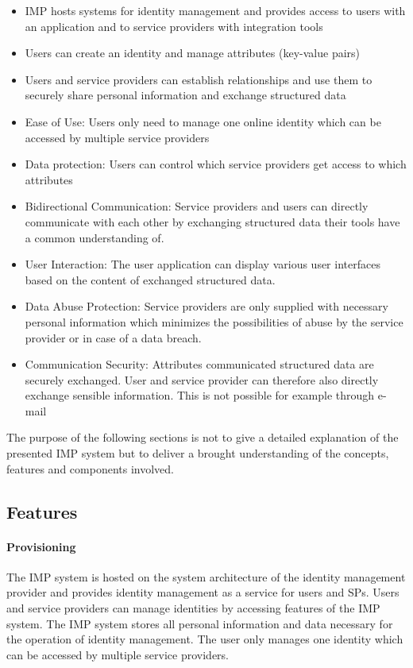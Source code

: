 \begin{itemize}
    \item IMP hosts systems for identity management and provides access to users with an application and to service providers with integration tools
    \item Users can create an identity and manage attributes (key-value pairs)
    \item Users and service providers can establish relationships and use them to securely share personal information and exchange structured data
\end{itemize}

\begin{itemize}
    \item Ease of Use: Users only need to manage one online identity which can be accessed by multiple service providers
    \item Data protection: Users can control which service providers get access to which attributes
    \item Bidirectional Communication: Service providers and users can directly communicate with each other by exchanging structured data their tools have a common understanding of.
    \item User Interaction: The user application can display various user interfaces based on the content of exchanged structured data.
    \item Data Abuse Protection: Service providers are only supplied with necessary personal information which minimizes the possibilities of abuse by the service provider or in case of a data breach.
    \item Communication Security: Attributes communicated structured data are securely exchanged. User and service provider can therefore also directly exchange sensible information. This is not possible for example through e-mail
\end{itemize}


The purpose of the following sections is not to give a detailed explanation of the presented IMP system but to deliver a brought understanding of the concepts, features and components involved.

\subsection{Features}

\paragraph{Provisioning} The IMP system is hosted on the system architecture of the identity management provider and provides identity management as a service for users and SPs. Users and service providers can manage identities by accessing features of the IMP system. The IMP system stores all personal information and data necessary for the operation of identity management. The user only manages one identity which can be accessed by multiple service providers.

